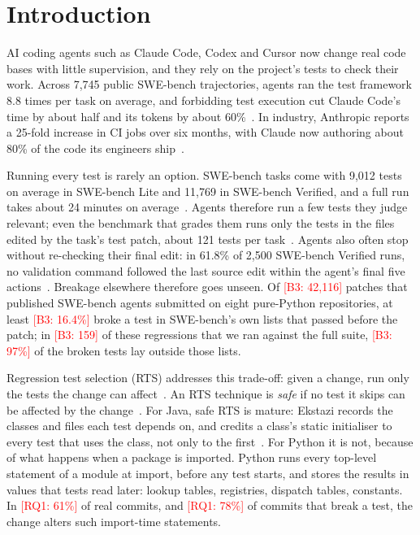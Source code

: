 \documentclass[acmsmall,screen,review,anonymous]{acmart}
\newcommand{\ph}[1]{\textcolor{red}{[#1]}}
\begin{document}
\maketitle

\section{Introduction}\label{sec:introduction}
AI coding agents such as Claude Code, Codex and Cursor now change real code bases with little supervision, and they rely on the project's tests to check their work. Across 7,745 public SWE-bench trajectories, agents ran the test framework 8.8 times per task on average, and forbidding test execution cut Claude Code's time by about half and its tokens by about 60\%~\cite{lin2026runornot}. In industry, Anthropic reports a 25-fold increase in CI jobs over six months, with Claude now authoring about 80\% of the code its engineers ship~\cite{malhotra2026ci}.

Running every test is rarely an option. SWE-bench tasks come with 9,012 tests on average in SWE-bench Lite and 11,769 in SWE-bench Verified, and a full run takes about 24 minutes on average~\cite{chen2026oldtests}. Agents therefore run a few tests they judge relevant; even the benchmark that grades them runs only the tests in the files edited by the task's test patch, about 121 tests per task~\cite{jimenez2024swebench}. Agents also often stop without re-checking their final edit: in 61.8\% of 2,500 SWE-bench Verified runs, no validation command followed the last source edit within the agent's final five actions~\cite{shu2026resolve}. Breakage elsewhere therefore goes unseen. Of \ph{B3: 42,116} patches that published SWE-bench agents submitted on eight pure-Python repositories, at least \ph{B3: 16.4\%} broke a test in SWE-bench's own lists that passed before the patch; in \ph{B3: 159} of these regressions that we ran against the full suite, \ph{B3: 97\%} of the broken tests lay outside those lists.

Regression test selection (RTS) addresses this trade-off: given a change, run only the tests the change can affect~\cite{yoo2012survey}. An RTS technique is \emph{safe} if no test it skips can be affected by the change~\cite{gligoric2015ekstazi}. For Java, safe RTS is mature: Ekstazi records the classes and files each test depends on, and credits a class's static initialiser to every test that uses the class, not only to the first~\cite{gligoric2015ekstazi}. For Python it is not, because of what happens when a package is imported. Python runs every top-level statement of a module at import, before any test starts, and stores the results in values that tests read later: lookup tables, registries, dispatch tables, constants. In \ph{RQ1: 61\%} of real commits, and \ph{RQ1: 78\%} of commits that break a test, the change alters such import-time statements.
\end{document}
